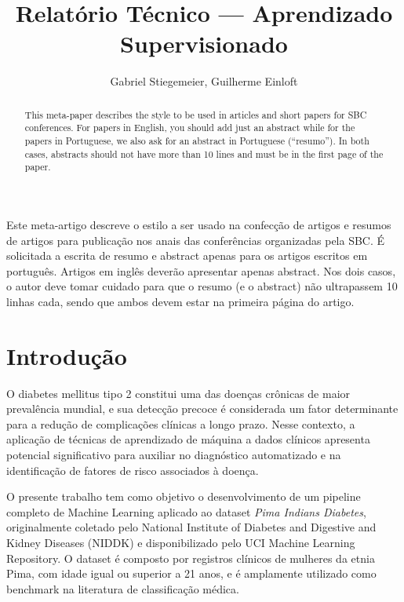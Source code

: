 \documentclass[12pt]{article}
\title{Relatório Técnico --- Aprendizado Supervisionado}
\author{Gabriel Stiegemeier\inst{1}, Guilherme Einloft\inst{1}}
\begin{document}
 

\maketitle

\begin{abstract}
  This meta-paper describes the style to be used in articles and short papers
  for SBC conferences. For papers in English, you should add just an abstract
  while for the papers in Portuguese, we also ask for an abstract in
  Portuguese (``resumo''). In both cases, abstracts should not have more than
  10 lines and must be in the first page of the paper.
\end{abstract}
     
\begin{resumo} 
  Este meta-artigo descreve o estilo a ser usado na confecção de artigos e
  resumos de artigos para publicação nos anais das conferências organizadas
  pela SBC. É solicitada a escrita de resumo e abstract apenas para os artigos
  escritos em português. Artigos em inglês deverão apresentar apenas abstract.
  Nos dois casos, o autor deve tomar cuidado para que o resumo (e o abstract)
  não ultrapassem 10 linhas cada, sendo que ambos devem estar na primeira
  página do artigo.
\end{resumo}



\section{Introdução}

O diabetes mellitus tipo 2 constitui uma das doenças crônicas de maior prevalência mundial, e sua detecção precoce é considerada um fator determinante para a redução de complicações clínicas a longo prazo. Nesse contexto, a aplicação de técnicas de aprendizado de máquina a dados clínicos apresenta potencial significativo para auxiliar no diagnóstico automatizado e na identificação de fatores de risco associados à doença.

O presente trabalho tem como objetivo o desenvolvimento de um pipeline completo de Machine Learning aplicado ao dataset \textit{Pima Indians Diabetes}, originalmente coletado pelo National Institute of Diabetes and Digestive and Kidney Diseases (NIDDK) e disponibilizado pelo UCI Machine Learning Repository. O dataset é composto por registros clínicos de mulheres da etnia Pima, com idade igual ou superior a 21 anos, e é amplamente utilizado como benchmark na literatura de classificação médica.
\end{document}
